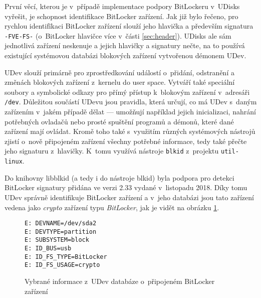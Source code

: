 \label{sec:bitlocker-identification}

První věcí, kterou je v~případě implementace podpory BitLockeru v~UDisks vyřešit, je schopnost identifikace BitLocker zařízení. Jak již bylo řečeno, pro rychlou identifïkaci BitLocker zařízení slouží jeho hlavička a především signatura \texttt{-FVE-FS-} (o~BitLocker hlavičce více v~části \ref{sec:header}). UDisks ale sám jednotlivá zařízení neskenuje a jejich hlavičky a signatury nečte, na to používá existující systémovou databázi blokových zařízení vytvořenou démonem UDev.

UDev slouží primárně pro zprostředkování událostí o~přidání, odstranění a změnách blokových zařízení z~kernelu do user space. Vytváří také speciální soubory a symbolické odkazy pro přímý přístup k~blokovým zařízení v~adresáři \texttt{/dev}. Důležitou součástí UDevu jsou pravidla, která určují, co má UDev s~daným zařízením v~jakém případě dělat --- umožňují například jejich inicializaci, nahrání potřebných ovladačů nebo prosté spuštění programů a démonů, které dané zařízení mají ovládat.\cite{Kenlon2018} Kromě toho také s~využitím různých systémových nástrojů zjistí o~nově připojeném zařízení všechny potřebné informace, tedy také přečte jeho signaturu z~hlavičky. K~tomu využívá nástroje \texttt{blkid} z~projektu \texttt{util-linux}\cite{Zak2017}.

Do knihovny libblkid (a tedy i do nástroje blkid) byla podpora pro detekci BitLocker signatury přidána ve verzi 2.33 vydané v~listopadu 2018\cite{Zak2018}. Díky tomu UDev správně identifikuje BitLocker zařízení a v~jeho databázi jsou tato zařízení vedena jako \emph{crypto} zařízení typu \emph{BitLocker}, jak je vidět na obrázku \ref{fig:udev-bitlocker}.

\begin{figure}[h]
		\centering
		\captionsetup{width=0.65\linewidth}
\begin{center}
\centering
\begin{lstlisting}[frame=none, basicstyle=\ttfamily\small, columns=fullflexible, keepspaces=true, xleftmargin=.35\textwidth, xrightmargin=.35\textwidth]
E: DEVNAME=/dev/sda2
E: DEVTYPE=partition
E: SUBSYSTEM=block
E: ID_BUS=usb
E: ID_FS_TYPE=BitLocker
E: ID_FS_USAGE=crypto
\end{lstlisting}
\end{center}
		\caption{Vybrané informace z~UDev databáze o~připojeném BitLocker zařízení}
		\label{fig:udev-bitlocker}
\end{figure}

